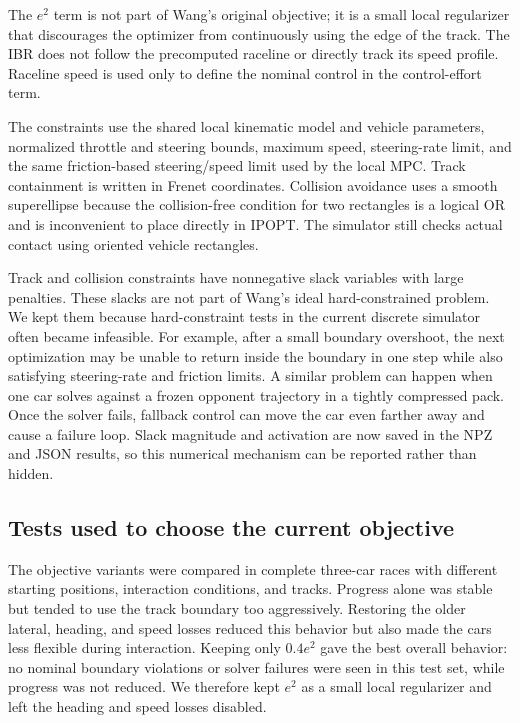 \documentclass[11pt]{article}
\begin{document}
The $e^2$ term is not part of Wang's original objective; it is a small local
regularizer that discourages the optimizer from continuously using the edge of
the track. The IBR does not follow the precomputed raceline or directly track
its speed profile. Raceline speed is used only to define the nominal control in
the control-effort term.

The constraints use the shared local kinematic model and vehicle parameters,
normalized throttle and steering bounds, maximum speed, steering-rate limit,
and the same friction-based steering/speed limit used by the local MPC. Track
containment is written in Frenet coordinates. Collision avoidance uses a
smooth superellipse because the collision-free condition for two rectangles is
a logical OR and is inconvenient to place directly in IPOPT. The simulator
still checks actual contact using oriented vehicle rectangles.

Track and collision constraints have nonnegative slack variables with large
penalties. These slacks are not part of Wang's ideal hard-constrained problem.
We kept them because hard-constraint tests in the current discrete simulator
often became infeasible. For example, after a small boundary overshoot, the
next optimization may be unable to return inside the boundary in one step
while also satisfying steering-rate and friction limits. A similar problem can
happen when one car solves against a frozen opponent trajectory in a tightly
compressed pack. Once the solver fails, fallback control can move the car even
farther away and cause a failure loop. Slack magnitude and activation are now
saved in the NPZ and JSON results, so this numerical mechanism can be reported
rather than hidden.

\subsection{Tests used to choose the current objective}

The objective variants were compared in complete three-car races with different
starting positions, interaction conditions, and tracks. Progress alone was
stable but tended to use the track boundary too aggressively. Restoring the
older lateral, heading, and speed losses reduced this behavior but also made the
cars less flexible during interaction. Keeping only $0.4e^2$ gave the best
overall behavior: no nominal boundary violations or solver failures were seen
in this test set, while progress was not reduced. We therefore kept $e^2$ as a
small local regularizer and left the heading and speed losses disabled.
\end{document}
